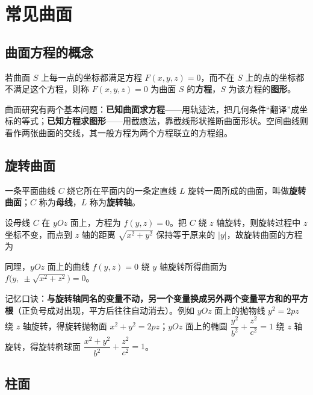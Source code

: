 \section{常见曲面}

\subsection{曲面方程的概念}

\begin{definition}
若曲面 $S$ 上每一点的坐标都满足方程 $F(x,y,z)=0$，而不在 $S$ 上的点的坐标都不满足这个方程，则称 $F(x,y,z)=0$ 为曲面 $S$ 的\textbf{方程}，$S$ 为该方程的\textbf{图形}。
\end{definition}

曲面研究有两个基本问题：\textbf{已知曲面求方程}——用轨迹法，把几何条件“翻译”成坐标的等式；\textbf{已知方程求图形}——用截痕法，靠截线形状推断曲面形状。空间曲线则看作两张曲面的交线，其一般方程为两个方程联立的方程组。

\subsection{旋转曲面}

\begin{definition}
一条平面曲线 $C$ 绕它所在平面内的一条定直线 $L$ 旋转一周所成的曲面，叫做\textbf{旋转曲面}；$C$ 称为\textbf{母线}，$L$ 称为\textbf{旋转轴}。
\end{definition}

设母线 $C$ 在 $yOz$ 面上，方程为 $f(y,z)=0$。把 $C$ 绕 $z$ 轴旋转，则旋转过程中 $z$ 坐标不变，而点到 $z$ 轴的距离 $\sqrt{x^{2}+y^{2}}$ 保持等于原来的 $|y|$，故旋转曲面的方程为


同理，$yOz$ 面上的曲线 $f(y,z)=0$ 绕 $y$ 轴旋转所得曲面为 $f\bigl(y,\ \pm\sqrt{x^{2}+z^{2}}\bigr)=0$。

记忆口诀：\textbf{与旋转轴同名的变量不动，另一个变量换成另外两个变量平方和的平方根}（正负号成对出现，平方后往往自动消去）。例如 $yOz$ 面上的抛物线 $y^{2}=2pz$ 绕 $z$ 轴旋转，得旋转抛物面 $x^{2}+y^{2}=2pz$；$yOz$ 面上的椭圆 $\dfrac{y^{2}}{b^{2}}+\dfrac{z^{2}}{c^{2}}=1$ 绕 $z$ 轴旋转，得旋转椭球面 $\dfrac{x^{2}+y^{2}}{b^{2}}+\dfrac{z^{2}}{c^{2}}=1$。

\subsection{柱面}

